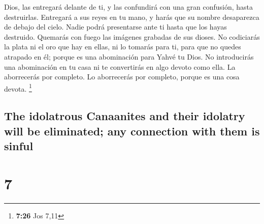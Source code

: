 \begin{paracol}{2}
Dios, las entregará delante de ti, y las confundirá con una gran
confusión, hasta destruirlas.  Entregará a sus reyes en
tu mano, y harás que su nombre desaparezca de debajo del cielo. Nadie
podrá presentarse ante ti hasta que los hayas destruido. 
Quemarás con fuego las imágenes grabadas de sus dioses. No codiciarás la
plata ni el oro que hay en ellas, ni lo tomarás para ti, para que no
quedes atrapado en él; porque es una abominación para Yahvé tu Dios.
 No introducirás una abominación en tu casa ni te
convertirás en algo devoto como ella. La aborrecerás por completo. Lo
aborrecerás por completo, porque es una cosa devota. \footnote{\textbf{7:26}
  Jos 7,11}

\switchcolumn
\begin{otherlanguage}{english}

\hypertarget{the-idolatrous-canaanites-and-their-idolatry-will-be-eliminated-any-connection-with-them-is-sinful}{%
\subsection{The idolatrous Canaanites and their idolatry will be
eliminated; any connection with them is
sinful}\label{the-idolatrous-canaanites-and-their-idolatry-will-be-eliminated-any-connection-with-them-is-sinful}}

\hypertarget{section-13}{%
\section{7}\label{section-13}}


\end{otherlanguage}
\end{paracol}
